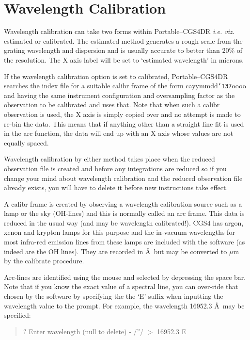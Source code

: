 \documentclass[a4paper]{book}
\renewcommand{\_}{{\tt\char'137}}
\begin{document}
\section{Wavelength Calibration}
Wavelength calibration can take two forms within Portable--CGS4DR {\em
i.e. viz.} estimated or calibrated. The estimated method generates a
rough scale from the grating wavelength and dispersion and is usually
accurate to better than 20\% of the resolution. The X axis label will be
set to `estimated wavelength' in microns. 

If the wavelength calibration option is set to calibrated,
Portable--CGS4DR searches the index file for a suitable {\sc calibr} frame
of the form cayymmdd\_oooo and having the same instrument configuration
and oversampling factor as the observation to be calibrated and uses that. 
Note that when such a {\sc calibr} observation is used, the X axis is
simply copied over and no attempt is made to re-bin the data. This means
that if anything other than a straight line fit is used in the {\sc arc}
function, the data will end up with an X axis whose values are not equally
spaced. 

Wavelength calibration by either method takes place when the reduced
observation file is created and before any integrations are reduced so if
you change your mind about wavelength calibration and the reduced
observation file already exists, you will have to delete it before new
instructions take effect. 

A {\sc calibr} frame is created by observing a wavelength calibration
source such as a lamp or the sky (OH-lines) and this is normally called an
{\sc arc} frame. This data is reduced in the usual way (and may be
wavelength calibrated!). CGS4 has argon, xenon and krypton lamps for this
purpose and the in-vacuum wavelengths for most infra-red emission lines
from these lamps are included with the software (as indeed are the OH
lines). They are recorded in \AA ~but may be converted to $\mu$m by the
calibrate procedure. 

Arc-lines are identified using the mouse and selected by depressing the
space bar. Note that if you know the exact value of a spectral line, you
can over-ride that chosen by the software by specifying the the `E' suffix
when inputting the wavelength value to the prompt. For example, the
wavelength 16952.3 \AA ~may be specified: 

\begin{quote}
? Enter wavelength (null to delete) - /''/ $>$ 16952.3 E
\end{quote}
\end{document}
